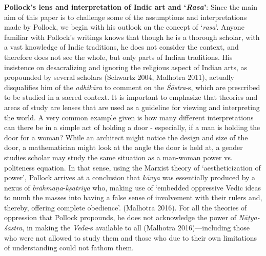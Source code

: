 \textbf{Pollock’s lens and interpretation of Indic art and ‘\textsl{Rasa}'}: Since the main aim of this paper is to challenge some of the assumptions and interpretations made by Pollock, we begin with his outlook on the concept of ‘\textsl{rasa}'. Anyone familiar with Pollock’s writings knows that though he is a thorough scholar, with a vast knowledge of Indic traditions, he does not consider the context, and therefore does not see the whole, but only parts of Indian traditions. His insistence on desacralizing and ignoring the religious aspect of Indian arts, as propounded by several scholars (Schwartz 2004, Malhotra 2011), actually disqualifies him of the \textsl{adhikāra} to comment on the \textsl{Śāstra}-s, which are prescribed to be studied in a sacred context. It is important to emphasize that theories and areas of study are lenses that are used as a guideline for viewing and interpreting the world. A very common example given is how many different interpretations can there be in a simple act of holding a door - especially, if a man is holding the door for a woman? While an architect might notice the design and size of the door, a mathematician might look at the angle the door is held at, a gender studies scholar may study the same situation as a man-woman power vs. politeness equation. In that sense, using the Marxist theory of ‘aestheticization of power’, Pollock arrives at a conclusion that \textsl{kāvya} was essentially produced by a nexus of \textsl{brāhmaṇa}-\textsl{kṣatriya} who, making use of ‘embedded oppressive Vedic ideas to numb the masses into having a false sense of involvement with their rulers and, thereby, offering complete obedience’. (Malhotra 2016). For all the theories of oppression that Pollock propounds, he does not acknowledge the power of \textsl{Nāṭya-śāstra}, in making the \textsl{Veda}-s available to all (Malhotra 2016)---including those who were not allowed to study them and those who due to their own limitations of understanding could not fathom them. 

